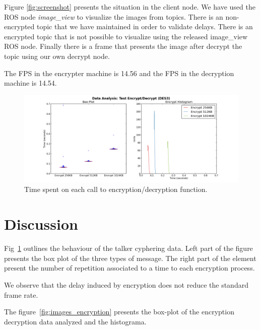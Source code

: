 \documentclass[journal,twoside]{JoPhA}
\begin{document}
Figure \ref{fig:screenshot} presents the situation in the client node. We have used the ROS node {\em image\_view} to visualize the images from topics.  There is an non-encrypted topic that we have maintained in order to validate delays. There is an encrypted topic that is not possible to visualize using the released image\_view ROS node. Finally there is a frame that presents the image after decrypt the topic using our own decrypt node. 


The FPS in the encrypter machine is 14.56 and the FPS in the decryption machine is 14.54.



\begin{figure}[ht]
    \centering
    \includegraphics[width=.9\textwidth]{Outline_encryption_text.png}
    \caption{Time spent on each call to encryption/decryption function.}
  \label{fig:text_encryption_time}
\end{figure}


\section{Discussion}

Fig~\ref{fig:text_encryption_time} outlines the behaviour of the talker cyphering data. Left part of the figure presents the box plot of the three types of message. The right part of the element present the number of repetition associated to a time to each encryption process.


We observe that the delay induced by encryption does not reduce the standard frame rate. 

The figure~\ref{fig:images_encryption} presents the box-plot of the encryption decryption data analyzed and the histograma. 
\end{document}
